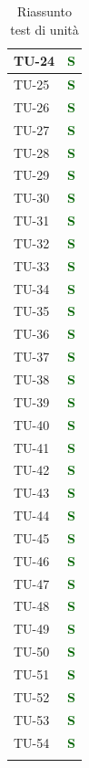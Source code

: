 \begin{longtable}{|C{2.5cm}|C{2.5cm}|}
	{TU-24} & \textcolor{darkgreen}{\textbf{S}}\\
	\hline
	{TU-25} & \textcolor{darkgreen}{\textbf{S}}\\
	\hline
	{TU-26} & \textcolor{darkgreen}{\textbf{S}}\\
	\hline
	{TU-27} & \textcolor{darkgreen}{\textbf{S}}\\
	\hline
	{TU-28} & \textcolor{darkgreen}{\textbf{S}}\\
	\hline
	{TU-29} & \textcolor{darkgreen}{\textbf{S}}\\
	\hline
	{TU-30} & \textcolor{darkgreen}{\textbf{S}}\\
	\hline
	{TU-31} & \textcolor{darkgreen}{\textbf{S}}\\
	\hline
	{TU-32} & \textcolor{darkgreen}{\textbf{S}}\\
	\hline
	{TU-33} & \textcolor{darkgreen}{\textbf{S}}\\
	\hline
	{TU-34} & \textcolor{darkgreen}{\textbf{S}}\\
	\hline
	{TU-35} & \textcolor{darkgreen}{\textbf{S}}\\
	\hline
	{TU-36} & \textcolor{darkgreen}{\textbf{S}}\\
	\hline
	{TU-37} & \textcolor{darkgreen}{\textbf{S}}\\
	\hline
	{TU-38} & \textcolor{darkgreen}{\textbf{S}}\\
	\hline
	{TU-39} & \textcolor{darkgreen}{\textbf{S}}\\
	\hline
	{TU-40} & \textcolor{darkgreen}{\textbf{S}}\\
	\hline
	{TU-41} & \textcolor{darkgreen}{\textbf{S}}\\
	\hline
	{TU-42} & \textcolor{darkgreen}{\textbf{S}}\\
	\hline
	{TU-43} & \textcolor{darkgreen}{\textbf{S}}\\
	\hline
	{TU-44} & \textcolor{darkgreen}{\textbf{S}}\\
	\hline
	{TU-45} & \textcolor{darkgreen}{\textbf{S}}\\
	\hline
	{TU-46} & \textcolor{darkgreen}{\textbf{S}}\\
	\hline
	{TU-47} & \textcolor{darkgreen}{\textbf{S}}\\
	\hline
	{TU-48} & \textcolor{darkgreen}{\textbf{S}}\\
	\hline
	{TU-49} & \textcolor{darkgreen}{\textbf{S}}\\
	\hline
	{TU-50} & \textcolor{darkgreen}{\textbf{S}}\\
	\hline
	{TU-51} & \textcolor{darkgreen}{\textbf{S}}\\
	\hline
	{TU-52} & \textcolor{darkgreen}{\textbf{S}}\\
	\hline
	{TU-53} & \textcolor{darkgreen}{\textbf{S}}\\
	\hline
	{TU-54} & \textcolor{darkgreen}{\textbf{S}}\\
	\hline
	\caption{Riassunto test di unità}
	\label{tabella:riassunto tu}
\end{longtable}
